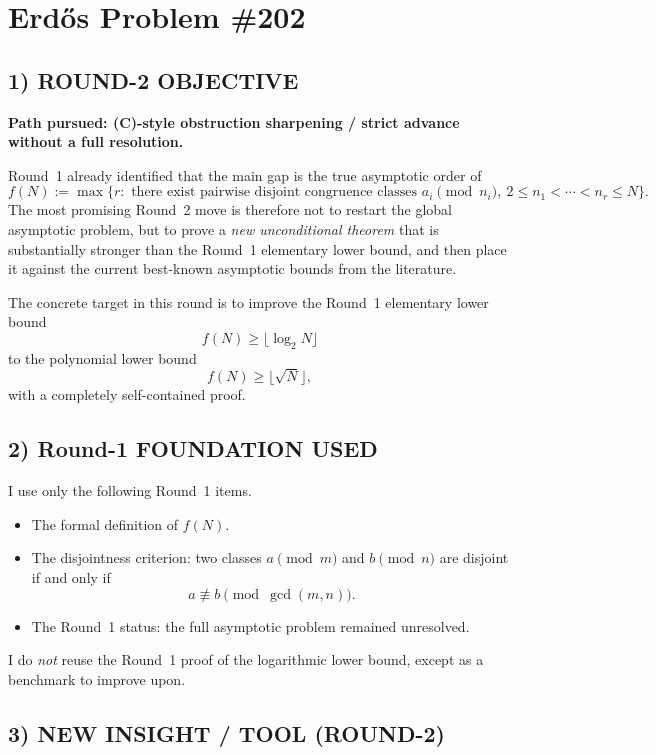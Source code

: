 \section{Erd\H{o}s Problem \#202}

\subsection*{1) ROUND-2 OBJECTIVE}

\textbf{Path pursued: (C)-style obstruction sharpening / strict advance without a full resolution.}

Round~1 already identified that the main gap is the true asymptotic order of
\[
f(N):=\max\{r:\text{ there exist pairwise disjoint congruence classes }a_i \pmod{n_i},\ 2\le n_1<\cdots<n_r\le N\}.
\]
The most promising Round~2 move is therefore not to restart the global asymptotic problem, but to prove a \emph{new unconditional theorem} that is substantially stronger than the Round~1 elementary lower bound, and then place it against the current best-known asymptotic bounds from the literature.

The concrete target in this round is to improve the Round~1 elementary lower bound
\[
f(N)\ge \lfloor \log_2 N\rfloor
\]
to the polynomial lower bound
\[
f(N)\ge \lfloor \sqrt{N}\rfloor,
\]
with a completely self-contained proof.

\subsection*{2) Round-1 FOUNDATION USED}

I use only the following Round~1 items.

\begin{itemize}
\item The formal definition of $f(N)$.
\item The disjointness criterion: two classes $a \pmod m$ and $b \pmod n$ are disjoint if and only if
\[
a\not\equiv b \pmod{\gcd(m,n)}.
\]
\item The Round~1 status: the full asymptotic problem remained unresolved.
\end{itemize}

I do \emph{not} reuse the Round~1 proof of the logarithmic lower bound, except as a benchmark to improve upon.

\subsection*{3) NEW INSIGHT / TOOL (ROUND-2)}

